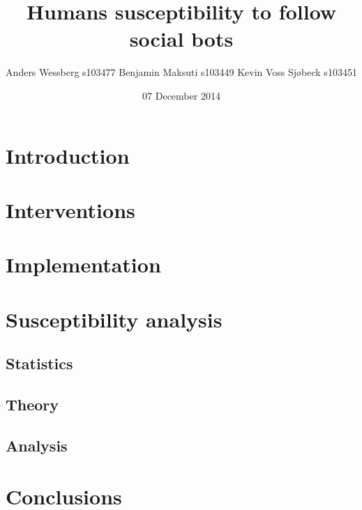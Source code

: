 \documentclass{acm_proc_article-sp}
\begin{document}
\title{Humans susceptibility to follow social bots}


\author{
\alignauthor
Anders Wessberg s103477
\alignauthor
Benjamin Maksuti s103449
\alignauthor
Kevin Voss Sj{\o}beck s103451
}
\date{07 December 2014}

\maketitle

\section{Introduction}

\section{Interventions}

\section{Implementation}

\section{Susceptibility analysis}

\subsection{Statistics}

\subsection{Theory}

\subsection{Analysis}

\section{Conclusions}

\end{document}
